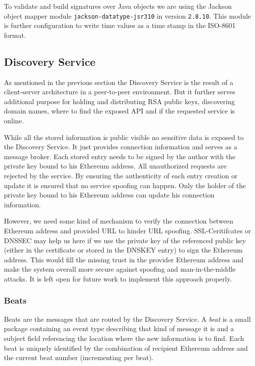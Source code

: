 To validate and build signatures over Java objects we are using the Jackson object mapper module \lstinline{jackson-datatype-jsr310} in version \lstinline{2.8.10}. This module is further configuration to write time values as a time stamp in the ISO-8601 format. 

\subsection{Discovery Service}
\label{sec:discoveryService}
As mentioned in the previous section the Discovery Service is the result of a client-server architecture in a peer-to-peer environment. But it further serves additional purpose for holding and distributing RSA public keys, discovering domain names, where to find the exposed API and if the requested service is online. 

While all the stored information is public visible no sensitive data is exposed to the Discovery Service. It just provides connection information and serves as a message broker. Each stored entry needs to be signed by the author with the private key bound to his Ethereum address. All unauthorized requests are rejected by the service. By ensuring the authenticity of each entry creation or update it is ensured that no service spoofing can happen. Only the holder of the private key bound to his Ethereum address can update his connection information.

However, we need some kind of mechanism to verify the connection between Ethereum address and provided URL to hinder URL spoofing. SSL-Ceritifcates or DNSSEC may help us here if we use the private key of the referenced public key (either in the certificate or stored in the DNSKEY entry) to sign the Ethereum address. This would fill the missing trust in the provider Ethereum address and make the system overall more secure against spoofing and man-in-the-middle attacks. It is left open for future work to implement this approach properly.

\subsubsection{Beats}
\label{sec:beats}
Beats are the messages that are routed by the Discovery Service. A \textit{beat} is a small package containing an event type describing that kind of message it is and a subject field referencing the location where the new information is to find. Each beat is uniquely identified by the combination of recipient Ethereum address and the current beat number (incrementing per beat).


